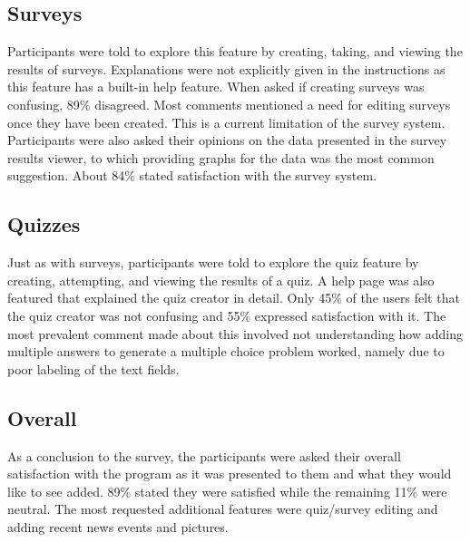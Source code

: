 \subsection*{Surveys}
Participants were told to explore this feature by creating, taking, and viewing the results of surveys. Explanations were not explicitly given in the instructions as this feature has a built-in help feature. When asked if creating surveys was confusing, 89\% disagreed. Most comments mentioned a need for editing surveys once they have been created. This is a current limitation of the survey system. Participants were also asked their opinions on the data presented in the survey results viewer, to which providing graphs for the data was the most common suggestion. About 84\% stated satisfaction with the survey system.

\subsection*{Quizzes}
Just as with surveys, participants were told to explore the quiz feature by creating, attempting, and viewing the results of a quiz. A help page was also featured that explained the quiz creator in detail. Only 45\% of the users felt that the quiz creator was not confusing and 55\% expressed satisfaction with it. The most prevalent comment made about this involved not understanding how adding multiple answers to generate a multiple choice problem worked, namely due to poor labeling of the text fields.

\subsection*{Overall}
As a conclusion to the survey, the participants were asked their overall satisfaction with the program as it was presented to them and what they would like to see added. 89\% stated they were satisfied while the remaining 11\% were neutral. The most requested additional features were quiz/survey editing and adding recent news events and pictures.


